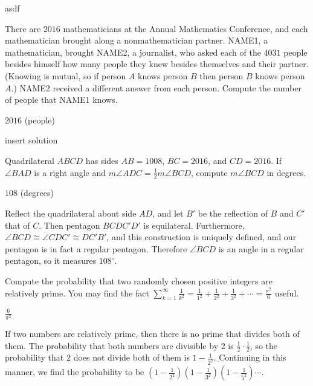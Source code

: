 \documentclass[11pt]{article}
\begin{document}
\begin{solution}
asdf
\end{solution}

\begin{problem}
There are $2016$ mathematicians at the Annual Mathematics Conference, and each mathematician brought along a nonmathematician partner. NAME1, a mathematician, brought NAME2, a journalist, who asked each of the $4031$ people besides himself how many people they knew besides themselves and their partner. (Knowing is mutual, so if person $A$ knows person $B$ then person $B$ knows person $A$.) NAME2 received a different answer from each person. Compute the number of people that NAME1 knows.
\end{problem}

\begin{answer}
$\boxed{2016}$ (people)
\end{answer}

\begin{solution}
insert solution
\end{solution}


\begin{problem}%
Quadrilateral $ABCD$ has sides $AB = 1008$, $BC = 2016$, and $CD = 2016$. If $\angle BAD$ is a right angle and $m\angle ADC = \frac{1}{2}m\angle BCD$, compute $m\angle BCD$ in degrees.
\end{problem}

\begin{answer}
$\boxed{108}$ (degrees)
\end{answer}

\begin{solution}
Reflect the quadrilateral about side $AD$, and let $B'$ be the reflection of $B$ and $C'$ that of $C$. Then pentagon $BCDC'D'$ is equilateral. Furthermore, $\angle BCD \cong \angle CDC' \cong DC'B'$, and this construction is uniquely defined, and our pentagon is in fact a regular pentagon. Therefore $\angle BCD$ is an angle in a regular pentagon, so it measures $\boxed{108^\circ}$.
\end{solution}


\begin{problem}
Compute the probability that two randomly chosen positive integers are relatively prime. You may find the fact $\sum\limits_{k = 1}^\infty \frac{1}{k^2} = \frac{1}{1^2} + \frac{1}{2^2} + \frac{1}{3^2} + \cdots = \frac{\pi^2}{6}$ useful.
\end{problem}

\begin{answer}
$\boxed{\frac{6}{\pi^2}}$
\end{answer}

\begin{solution}
If two numbers are relatively prime, then there is no prime that divides both of them. The probability that both numbers are divisible by $2$ is $\frac{1}{2} \cdot \frac{1}{2}$, so the probability that $2$ does not divide both of them is $1 - \frac{1}{2^2}$. Continuing in this manner, we find the probability to be $\left(1 - \frac{1}{2^2}\right)\left(1 - \frac{1}{3^2}\right)\left(1 - \frac{1}{5^2}\right) \cdots$.
\end{solution}
\end{document}
